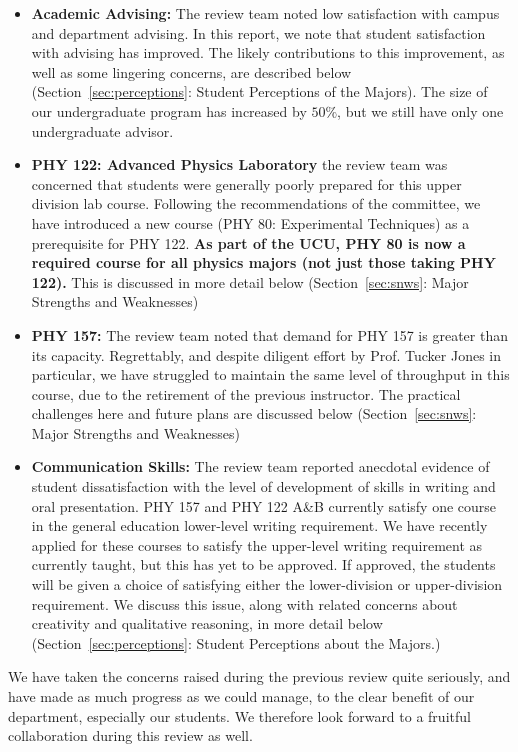 \documentclass[12pt]{article}
\begin{document}
\begin{itemize}
 \item {\bf Academic Advising:} The review team noted low satisfaction
   with campus and department advising.  In this report, we note that
   student satisfaction with advising has improved.  The likely
   contributions to this improvement, as well as some lingering
   concerns, are described below (Section~\ref{sec:perceptions}:
   Student Perceptions of the Majors).  The size of our undergraduate
   program has increased by $50\%$, but we still have only one
   undergraduate advisor.

 \item {\bf PHY 122: Advanced Physics Laboratory} the review team was
   concerned that students were generally poorly prepared for this
   upper division lab course.  Following the recommendations of the
   committee, we have introduced a new course (PHY 80: Experimental
   Techniques) as a prerequisite for PHY 122.  {\bf As part of the
     UCU, PHY 80 is now a required course for all physics majors (not
     just those taking PHY 122).}  This is discussed in more detail
   below (Section~\ref{sec:snws}: Major Strengths and Weaknesses)
  
 \item {\bf PHY 157:} The review team noted that demand for PHY 157 is
   greater than its capacity.  Regrettably, and despite diligent
   effort by Prof. Tucker Jones in particular, we have struggled to
   maintain the same level of throughput in this course, due to the
   retirement of the previous instructor.  The practical challenges
   here and future plans are discussed below (Section~\ref{sec:snws}:
   Major Strengths and Weaknesses)

 \item {\bf Communication Skills:} The review team reported anecdotal
   evidence of student dissatisfaction with the level of development
   of skills in writing and oral presentation.  PHY 157 and PHY 122
   A\&B currently satisfy one course in the general education
   lower-level writing requirement.  We have recently applied for these 
   courses to satisfy the upper-level writing requirement as currently
   taught, but this has yet to be approved.  If approved, the students
   will be given a choice of satisfying either the lower-division or 
   upper-division requirement.  We discuss this
   issue, along with related concerns about creativity and qualitative
   reasoning, in more detail below (Section~\ref{sec:perceptions}:
   Student Perceptions about the Majors.)
\end{itemize}
We have taken the concerns raised during the previous review quite
seriously, and have made as much progress as we could manage, to the
clear benefit of our department, especially our students.  We
therefore look forward to a fruitful collaboration during this review
as well.
\end{document}
